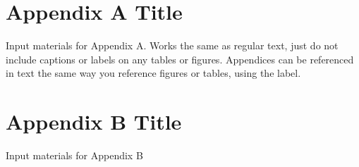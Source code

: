 \documentclass{article}
\begin{document}
\begin{doublespacing}
\newpage %
\begin{appendices}

\section{Appendix A Title}
\label{appendix:appendix_a_label}

Input materials for Appendix A. Works the same as regular text, just do not include captions or labels on any tables or figures. Appendices can be referenced in text the same way you reference figures or tables, using the label. 

\newpage

\section{Appendix B Title}
\label{appendix:appendix_b_label}

Input materials for Appendix B

\end{appendices}

\newpage %
\end{doublespacing} %
\end{document}
